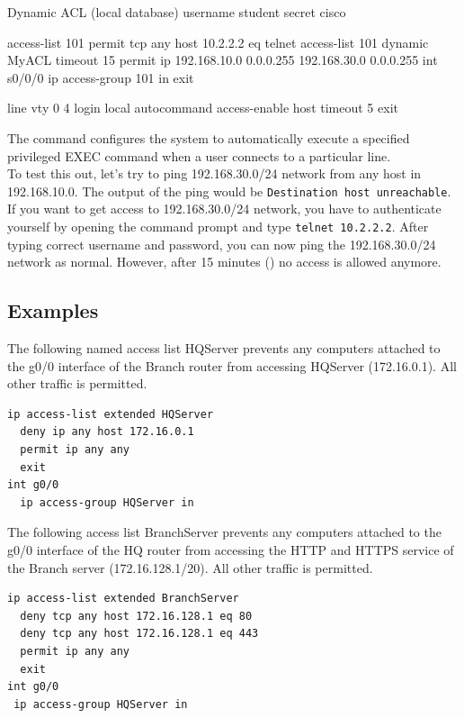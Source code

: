 \begin{sexylisting}{Dynamic ACL (local database)}
username student secret cisco

access-list 101 permit tcp any host 10.2.2.2 eq telnet
access-list 101 dynamic MyACL timeout 15 permit ip 192.168.10.0 0.0.0.255 192.168.30.0 0.0.0.255
int s0/0/0
	ip access-group 101 in
	exit
	
line vty 0 4
	login local
	autocommand access-enable host timeout 5
	exit
\end{sexylisting}

The  command configures the system to automatically execute a specified privileged EXEC command when a user connects to a particular line. \\

To test this out, let's try to ping 192.168.30.0/24 network from any host in 192.168.10.0. The output of the ping would be \texttt{Destination host unreachable}. If you want to get access to 192.168.30.0/24 network, you have to authenticate yourself by opening the command prompt and type \texttt{telnet 10.2.2.2}. After typing correct username and password, you can now ping the 192.168.30.0/24 network as normal. However, after 15 minutes () no access is allowed anymore.\\

\subsection{Examples}

\begin{example}
The following named access list HQServer prevents any computers attached to the g0/0 interface of the Branch router from accessing HQServer (172.16.0.1). All other traffic is permitted.
\begin{verbatim}
ip access-list extended HQServer
  deny ip any host 172.16.0.1
  permit ip any any
  exit
int g0/0
  ip access-group HQServer in
\end{verbatim}
\end{example}

\begin{example}
The following access list BranchServer prevents any computers attached to the g0/0 interface of the HQ router from accessing the HTTP and HTTPS service of the Branch server (172.16.128.1/20). All other traffic is permitted.
\begin{verbatim}
ip access-list extended BranchServer
  deny tcp any host 172.16.128.1 eq 80
  deny tcp any host 172.16.128.1 eq 443
  permit ip any any
  exit
int g0/0
 ip access-group HQServer in
\end{verbatim}
\end{example}


